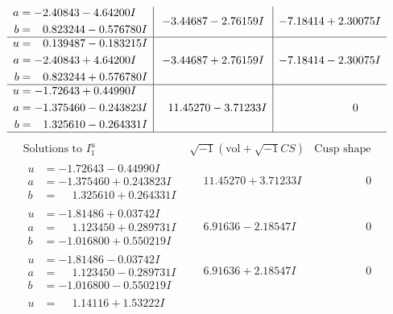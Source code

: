 \documentclass[1p]{elsarticle_modified}
\theoremstyle{definition}
\newcommand{\I}{\sqrt{-1}}
\begin{document}
$$\begin{array}{c|c|c}
\begin{aligned}
a &= -2.40843 - 4.64200 I \\
b &= \phantom{-}0.823244 - 0.576780 I\end{aligned}
 & -3.44687 - 2.76159 I & -7.18414 + 2.30075 I \\ \hline\begin{aligned}
u &= \phantom{-}0.139487 - 0.183215 I \\
a &= -2.40843 + 4.64200 I \\
b &= \phantom{-}0.823244 + 0.576780 I\end{aligned}
 & -3.44687 + 2.76159 I & -7.18414 - 2.30075 I \\ \hline\begin{aligned}
u &= -1.72643 + 0.44990 I \\
a &= -1.375460 - 0.243823 I \\
b &= \phantom{-}1.325610 - 0.264331 I\end{aligned}
 & \phantom{-}11.45270 - 3.71233 I & \phantom{-0.000000 } 0\\
 \hline 
 \end{array}$$\newpage$$\begin{array}{c|c|c}  
\text{Solutions to }I^u_{1}& \I (\text{vol} + \sqrt{-1}CS) & \text{Cusp shape}\\
 \hline 
\begin{aligned}
u &= -1.72643 - 0.44990 I \\
a &= -1.375460 + 0.243823 I \\
b &= \phantom{-}1.325610 + 0.264331 I\end{aligned}
 & \phantom{-}11.45270 + 3.71233 I & \phantom{-0.000000 } 0 \\ \hline\begin{aligned}
u &= -1.81486 + 0.03742 I \\
a &= \phantom{-}1.123450 + 0.289731 I \\
b &= -1.016800 + 0.550219 I\end{aligned}
 & \phantom{-}6.91636 - 2.18547 I & \phantom{-0.000000 } 0 \\ \hline\begin{aligned}
u &= -1.81486 - 0.03742 I \\
a &= \phantom{-}1.123450 - 0.289731 I \\
b &= -1.016800 - 0.550219 I\end{aligned}
 & \phantom{-}6.91636 + 2.18547 I & \phantom{-0.000000 } 0 \\ \hline\begin{aligned}
u &= \phantom{-}1.14116 + 1.53222 I \\

\end{aligned}
\end{array}$$
\end{document}
